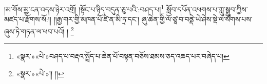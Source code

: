 །མ་གོས་མྱ་ངན་འདས་ཉེར་འགྲོ། །སྟོང་པ་ཉིད་བདུན་ཅུ་པའི་:བཤད་པ།\footnote{«སྣར་»«པེ་»བཤད་པ་བརྡའ་སྤྲོད་པ་ཆེན་པོ་བསྟན་བཅོས་ཐམས་ཅད་འཆད་པར་བཞེད་པ།} སློབ་དཔོན་འཕགས་པ་ཀླུ་སྒྲུབ་ཀྱིས་མཛད་པ་རྫོགས་སོ:།། །།རྒྱ་གར་གྱི་མཁན་པོ་ཛི་ན་མི་ཏྲ་དང་། ཞུ་ཆེན་གྱི་ལོ་ཙཱ་བ་བནྡེ་ཡེ་ཤེས་སྡེ་ལ་སོགས་པས་ཞུས་ཏེ་གཏན་ལ་ཕབ་པའོ། ། \footnote{«སྣར་»«པེ་»།། །། }